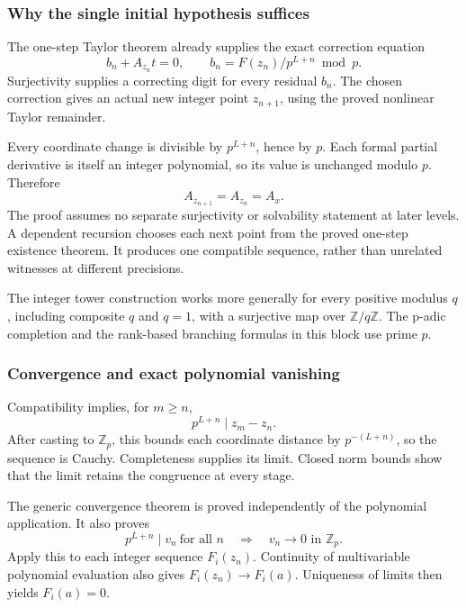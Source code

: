 \hypertarget{cont3:why-the-single-initial-hypothesis-suffices}{%
\subsubsection{Why the single initial hypothesis
suffices}\label{cont3:why-the-single-initial-hypothesis-suffices}}

The one-step Taylor theorem already supplies the exact correction
equation \[
b_n+A_{z_n}t=0,\qquad
b_n=F(z_n)/p^{L+n}\bmod p.
\] Surjectivity supplies a correcting digit for every residual \(b_n\).
The chosen correction gives an actual new integer point \(z_{n+1}\),
using the proved nonlinear Taylor remainder.

Every coordinate change is divisible by \(p^{L+n}\), hence by \(p\).
Each formal partial derivative is itself an integer polynomial, so its
value is unchanged modulo \(p\). Therefore \[
A_{z_{n+1}}=A_{z_n}=A_x.
\] The proof assumes no separate surjectivity or solvability statement
at later levels. A dependent recursion chooses each next point from the
proved one-step existence theorem. It produces one compatible sequence,
rather than unrelated witnesses at different precisions.

The integer tower construction works more generally for every positive
modulus \(q\), including composite \(q\) and \(q=1\), with a surjective
map over \(\mathbb Z/q\mathbb Z\). The p-adic completion and the
rank-based branching formulas in this block use prime \(p\).

\hypertarget{cont3:convergence-and-exact-polynomial-vanishing}{%
\subsubsection{Convergence and exact polynomial
vanishing}\label{cont3:convergence-and-exact-polynomial-vanishing}}

Compatibility implies, for \(m\ge n\), \[
p^{L+n}\mid z_m-z_n.
\] After casting to \(\mathbb Z_p\), this bounds each coordinate
distance by \(p^{-(L+n)}\), so the sequence is Cauchy. Completeness
supplies its limit. Closed norm bounds show that the limit retains the
congruence at every stage.

The generic convergence theorem is proved independently of the
polynomial application. It also proves \[
p^{L+n}\mid v_n\ \text{for all }n
\quad\Longrightarrow\quad v_n\longrightarrow0\text{ in }\mathbb Z_p.
\] Apply this to each integer sequence \(F_i(z_n)\). Continuity of
multivariable polynomial evaluation also gives \(F_i(z_n)\to F_i(a)\).
Uniqueness of limits then yields \(F_i(a)=0\).

